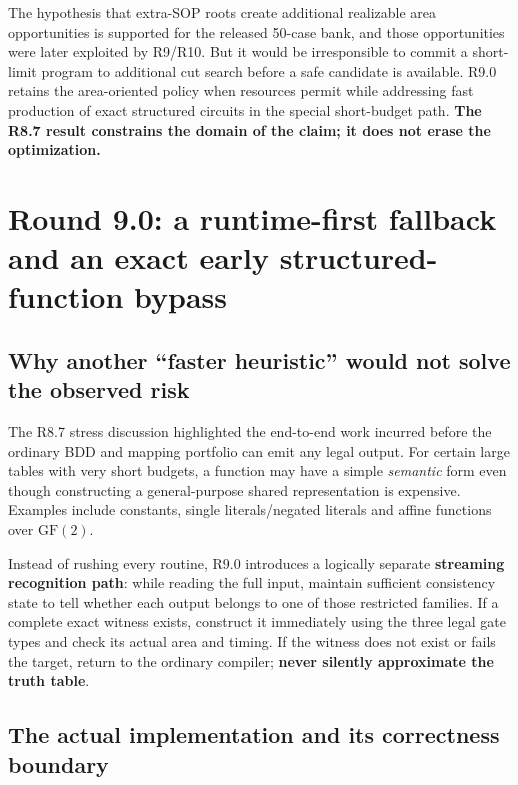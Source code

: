 The hypothesis that extra-SOP roots create additional realizable area opportunities is supported for the released 50-case bank, and those opportunities were later exploited by R9/R10. But it would be irresponsible to commit a short-limit program to additional cut search before a safe candidate is available. R9.0 retains the area-oriented policy when resources permit while addressing fast production of exact structured circuits in the special short-budget path. \textbf{The R8.7 result constrains the domain of the claim; it does not erase the optimization.}

\section{Round 9.0: a runtime-first fallback and an exact early structured-function bypass}\label{round-9.0-a-runtime-first-fallback-and-an-exact-early-structured-function-bypass}

\subsection{Why another ``faster heuristic'' would not solve the observed risk}\label{why-another-faster-heuristic-would-not-solve-the-observed-risk}

The R8.7 stress discussion highlighted the end-to-end work incurred before the ordinary BDD and mapping portfolio can emit any legal output. For certain large tables with very short budgets, a function may have a simple \emph{semantic} form even though constructing a general-purpose shared representation is expensive. Examples include constants, single literals/negated literals and affine functions over \(\mathrm{GF}(2)\).

Instead of rushing every routine, R9.0 introduces a logically separate \textbf{streaming recognition path}: while reading the full input, maintain sufficient consistency state to tell whether each output belongs to one of those restricted families. If a complete exact witness exists, construct it immediately using the three legal gate types and check its actual area and timing. If the witness does not exist or fails the target, return to the ordinary compiler; \textbf{never silently approximate the truth table}.

\subsection{The actual implementation and its correctness boundary}\label{the-actual-implementation-and-its-correctness-boundary}

